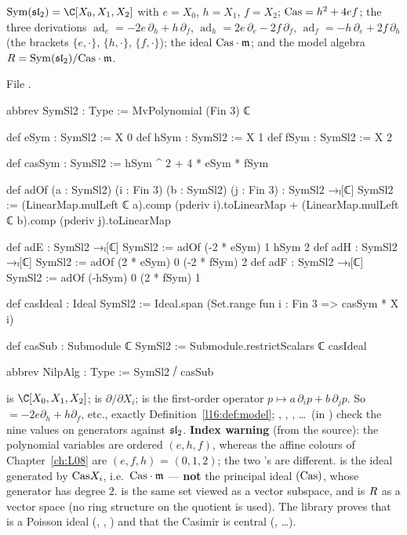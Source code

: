 \begin{definition}\label{l16:def:model}
$\operatorname{Sym}(\lsixteensl) = \C[X_0,X_1,X_2]$ with $e = X_0$, $h = X_1$, $f = X_2$; $\mathrm{Cas} = h^2+4ef$; the three
derivations $\operatorname{ad}_e = -2e\,\partial_h + h\,\partial_f$, $\operatorname{ad}_h = 2e\,\partial_e - 2f\,\partial_f$,
$\operatorname{ad}_f = -h\,\partial_e + 2f\,\partial_h$ (the brackets $\{e,\cdot\}$, $\{h,\cdot\}$, $\{f,\cdot\}$); the ideal
$\mathrm{Cas}\cdot\mathfrak m$; and the model algebra $R = \operatorname{Sym}(\mathfrak{sl}_2)/\mathrm{Cas}\cdot\mathfrak m$.
\end{definition}
\noindent File .
\begin{leancode}
abbrev SymSl2 : Type := MvPolynomial (Fin 3) ℂ

def eSym : SymSl2 := X 0
def hSym : SymSl2 := X 1
def fSym : SymSl2 := X 2

def casSym : SymSl2 := hSym ^ 2 + 4 * eSym * fSym

def adOf (a : SymSl2) (i : Fin 3) (b : SymSl2) (j : Fin 3) : SymSl2 →ₗ[ℂ] SymSl2 :=
  (LinearMap.mulLeft ℂ a).comp (pderiv i).toLinearMap
    + (LinearMap.mulLeft ℂ b).comp (pderiv j).toLinearMap

def adE : SymSl2 →ₗ[ℂ] SymSl2 := adOf (-2 * eSym) 1 hSym 2
def adH : SymSl2 →ₗ[ℂ] SymSl2 := adOf (2 * eSym) 0 (-2 * fSym) 2
def adF : SymSl2 →ₗ[ℂ] SymSl2 := adOf (-hSym) 0 (2 * fSym) 1

def casIdeal : Ideal SymSl2 := Ideal.span (Set.range fun i : Fin 3 => casSym * X i)

def casSub : Submodule ℂ SymSl2 := Submodule.restrictScalars ℂ casIdeal

abbrev NilpAlg : Type := SymSl2 ⧸ casSub
\end{leancode}

\begin{dictionary}
 is $\C[X_0,X_1,X_2]$;  is $\partial/\partial X_i$;  is the
first-order operator $p\mapsto a\,\partial_ip + b\,\partial_jp$. So  $=-2e\partial_h + h\partial_f$, etc., exactly
Definition~\ref{l16:def:model}; , , , \ldots\ (in
) check the nine values on generators against $\mathfrak{sl}_2$. \textbf{Index warning}
(from the source): the polynomial variables are ordered $(e,h,f)$, whereas the affine colours of Chapter~\ref{ch:L08} are
$(e,f,h)$ = $(0,1,2)$; the two 's are different.  is the ideal generated by
$\mathrm{Cas} X_i$, i.e.\ $\mathrm{Cas}\cdot\mathfrak m$ --- \textbf{not} the principal ideal $(\mathrm{Cas})$, whose
generator has degree $2$.  is the same set viewed as a vector subspace, and  is $R$ as a
vector space (no ring structure on the quotient is used). The library proves that  is a Poisson ideal
(, , ) and that the Casimir is central (, \ldots).
\end{dictionary}

